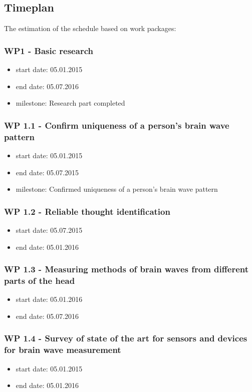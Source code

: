 \subsection{Timeplan}
The estimation of the schedule based on work packages:

\subsubsection{WP1 - Basic research}
\begin{itemize}
\item start date: 05.01.2015
\item end date:  05.07.2016
\item milestone: Research part completed
\end{itemize}


\subsubsection{WP 1.1 - Confirm uniqueness of a person’s brain wave pattern}
\begin{itemize}
\item start date: 05.01.2015
\item end date: 05.07.2015
\item milestone: Confirmed uniqueness of a person’s brain wave pattern
\end{itemize}
\subsubsection{WP 1.2 - Reliable thought identification}
\begin{itemize}
\item start date: 05.07.2015
\item end date:  05.01.2016
\end{itemize}
\subsubsection{WP 1.3 - Measuring methods of brain waves from different parts of the head}
\begin{itemize}
\item start date: 05.01.2016
\item end date: 05.07.2016
\end{itemize}
\subsubsection{WP 1.4 - Survey of state of the art for sensors and devices for brain wave measurement}
\begin{itemize}
\item start date: 05.01.2015
\item end date: 05.01.2016
\end{itemize}
